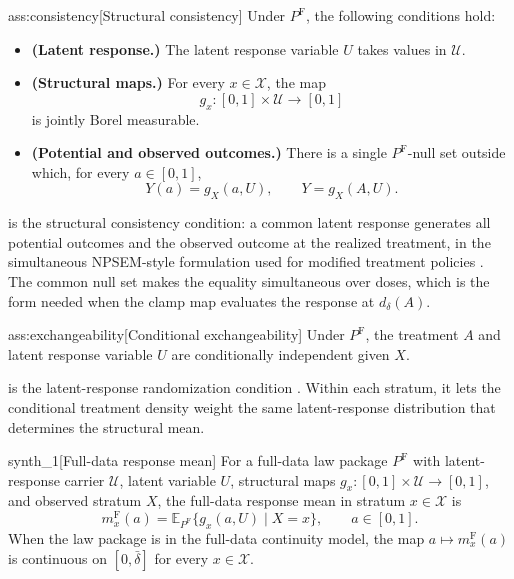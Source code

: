 \documentclass[11pt]{article}
\begin{document}
\begin{assumptionv}{ass:consistency}[Structural consistency]
Under \(P^{\mathrm F}\), the following conditions hold:
\begin{itemize}
\item \textbf{(Latent response.)} The latent response variable \(U\) takes values in \(\mathcal U\).
\item \textbf{(Structural maps.)} For every \(x\in\mathcal X\), the map
\[
g_x:[0,1]\times\mathcal U\to[0,1]
\]
is jointly Borel measurable.
\item \textbf{(Potential and observed outcomes.)} There is a single \(P^{\mathrm F}\)-null set outside which, for every \(a\in[0,1]\),
\[
Y(a)=g_X(a,U),
\qquad
Y=g_X(A,U).
\]
\end{itemize}
\end{assumptionv}

 is the structural consistency condition: a common latent response generates all potential outcomes and the observed outcome at the realized treatment, in the simultaneous NPSEM-style formulation used for modified treatment policies \citep{DiazWilliamsHoffmanSchenck2023}. The common null set makes the equality simultaneous over doses, which is the form needed when the clamp map evaluates the response at \(d_\delta(A)\).

\begin{assumptionv}{ass:exchangeability}[Conditional exchangeability]
Under \(P^{\mathrm F}\), the treatment \(A\) and latent response variable \(U\) are conditionally independent given \(X\).
\end{assumptionv}

 is the latent-response randomization condition \citep{DiazWilliamsHoffmanSchenck2023}. Within each stratum, it lets the conditional treatment density weight the same latent-response distribution that determines the structural mean.

\begin{definitionv}{synth_1}[Full-data response mean]
For a full-data law package \(P^{\mathrm F}\) with latent-response carrier \(\mathcal U\), latent variable \(U\), structural maps \(g_x:[0,1]\times\mathcal U\to[0,1]\), and observed stratum \(X\), the full-data response mean in stratum \(x\in\mathcal X\) is
\[
  m_x^{\mathrm F}(a)=\mathbb E_{P^{\mathrm F}}\{g_x(a,U)\mid X=x\},\qquad a\in[0,1].
\]
When the law package is in the full-data continuity model, the map \(a\mapsto m_x^{\mathrm F}(a)\) is continuous on \([0,\bar\delta]\) for every \(x\in\mathcal X\).
\end{definitionv}
\end{document}
